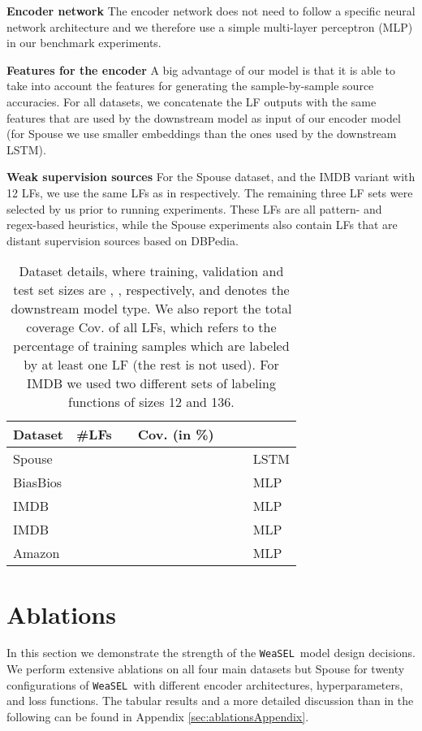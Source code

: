 \documentclass{article}
\newcommand{\weasel}{\texttt{WeaSEL}}\newcommand{\brackets}[1]{\left( #1 \right)}
\begin{document}
\textbf{Encoder network} 
The encoder network  does not need to follow a specific neural network architecture and we therefore use a simple multi-layer perceptron (MLP) in our benchmark experiments. 

\textbf{Features for the encoder} 
A big advantage of our model is that it is able to take into account the features  for generating the sample-by-sample source accuracies. For all datasets, we concatenate the LF outputs with the same features that are used by the downstream model as input of our encoder model (for Spouse we use smaller embeddings than the ones used by the downstream LSTM). 

\textbf{Weak supervision sources} 
For the Spouse dataset, and the IMDB variant with 12 LFs, we use the same LFs as in \cite{triplets, TripletsMean} respectively. The remaining three LF sets were selected by us prior to running experiments.
These LFs are all pattern- and regex-based heuristics, while the Spouse experiments also contain LFs that are distant supervision sources based on DBPedia. 

\begin{table}
\centering
\caption{Dataset details, where training, validation and test set sizes are , ,  respectively, and  denotes
the downstream model type. We also report the total coverage Cov. of all LFs, which refers to the percentage of training samples which are labeled by at least one LF (the rest is not used). For IMDB we used two different sets of labeling functions of sizes 12 and 136. }
\begin{tabular}{@{} *7l @{}}
\toprule
    Dataset  & \#LFs &  & Cov. \small{(in \%)}  &   &  & \\ 
    \midrule
    Spouse  &      &   &  &  &     & LSTM \\
    BiasBios &     &  &  &   &   & MLP \\
    IMDB     &     &     &  &   &      & MLP \\
    IMDB     &     &    &  &   &      & MLP \\
    Amazon   &     &   &     &   &      & MLP \\
\bottomrule
\end{tabular}
\label{tab:datasets}
\end{table}




\section{Ablations}
In this section we demonstrate the strength of the \weasel\ model design decisions. We perform extensive ablations on all four main datasets but Spouse for twenty configurations of \weasel\ with different encoder architectures, hyperparameters, and loss functions.
The tabular results and a more detailed discussion than in the following can be found in Appendix \ref{sec:ablationsAppendix}.
\end{document}
